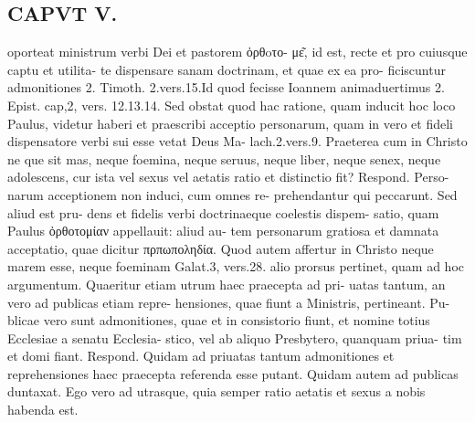 \documentclass{article}
\begin{document}
\begin{pages}
\section*{CAPVT  V. }
\marginpar{[ p.249 ]}oporteat ministrum verbi Dei et pastorem ὀρθoτο- με͂, id est, recte et pro cuiusque captu et utilita- te dispensare sanam doctrinam, et quae ex ea pro- ficiscuntur admonitiones 2. Timoth. 2.vers.15.Id quod fecisse Ioannem animaduertimus 2. Epist. cap,2, vers. 12.13.14. Sed obstat quod hac ratione, quam inducit hoc loco Paulus, videtur haberi et praescribi acceptio personarum, quam in vero et fideli dispensatore verbi sui esse vetat Deus Ma- lach.2.vers.9. Praeterea cum in Christo ne que sit mas, neque foemina, neque seruus, neque liber, neque senex, neque adolescens, cur ista vel sexus vel aetatis ratio et distinctio fit? Respond. Perso- narum acceptionem non induci, cum omnes re- prehendantur qui peccarunt. Sed aliud est pru- dens et fidelis verbi doctrinaeque coelestis dispem- satio, quam Paulus ὀρθοτομίαν appellauit: aliud au- tem personarum gratiosa et damnata acceptatio, quae dicitur πρπωποληδία. Quod autem affertur in Christo neque marem esse, neque foeminam Galat.3, vers.28. alio prorsus pertinet, quam ad hoc argumentum. Quaeritur etiam utrum haec praecepta ad pri- uatas tantum, an vero ad publicas etiam repre- hensiones, quae fiunt a Ministris, pertineant. Pu- blicae vero sunt admonitiones, quae et in consistorio fiunt, et nomine totius Ecclesiae a senatu Ecclesia- stico, vel ab aliquo Presbytero, quanquam priua- tim et domi fiant. Respond. Quidam ad priuatas tantum admonitiones et reprehensiones haec praecepta referenda esse putant. Quidam autem ad publicas duntaxat. Ego vero ad utrasque, quia semper ratio aetatis et sexus a nobis habenda est. 

\end{pages}
\end{document}
